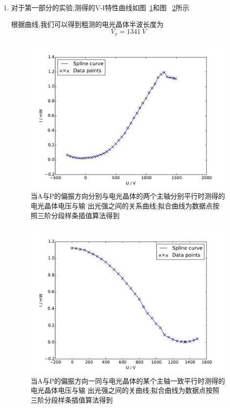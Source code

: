 \documentclass[aps,pre,12pt,preprint,onecolumn,showpacs,showkeys]{revtex4-1}
\begin{document}
\begin{enumerate}
    \item
        对于第一部分的实验,测得的V-I特性曲线如图~\ref{fig:plot1}和图
        ~\ref{fig:plot2}所示

        根据曲线,我们可以得到粗测的电光晶体半波长度为
        \begin{equation}
            V_{\pi} = \SI{1341}{V}
        \end{equation}

\begin{figure}[htbp]
    \centering
    \includegraphics[width=\textwidth]{figure_1.pdf}
    \caption{\label{fig:plot1}%
        当A与P的偏振方向分别与电光晶体的两个主轴分别平行时测得的电光晶体电压与输
        出光强之间的关系曲线;拟合曲线为数据点按照三阶分段样条插值算法得到}
\end{figure}

\begin{figure}[htbp]
    \centering
    \includegraphics[width=\textwidth]{figure_2.pdf}
    \caption{\label{fig:plot2}%
        当A与P的偏振方向一同与电光晶体的某个主轴一致平行时测得的电光晶体电压与输
        出光强之间的关曲线;拟合曲线为数据点按照三阶分段样条插值算法得到}
\end{figure}


\end{enumerate}
\end{document}
